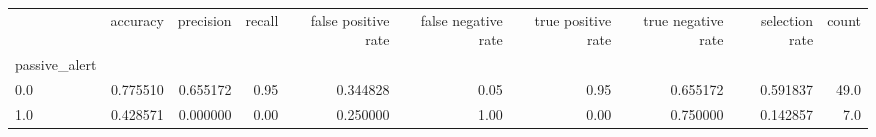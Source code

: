 \begin{tabular}{lrrrrrrrrr}
\toprule
{} &  accuracy &  precision &  recall &  false positive rate &  false negative rate &  true positive rate &  true negative rate &  selection rate &  count \\
passive\_alert &           &            &         &                      &                      &                     &                     &                 &        \\
\midrule
0.0           &  0.775510 &   0.655172 &    0.95 &             0.344828 &                 0.05 &                0.95 &            0.655172 &        0.591837 &   49.0 \\
1.0           &  0.428571 &   0.000000 &    0.00 &             0.250000 &                 1.00 &                0.00 &            0.750000 &        0.142857 &    7.0 \\
\bottomrule
\end{tabular}
